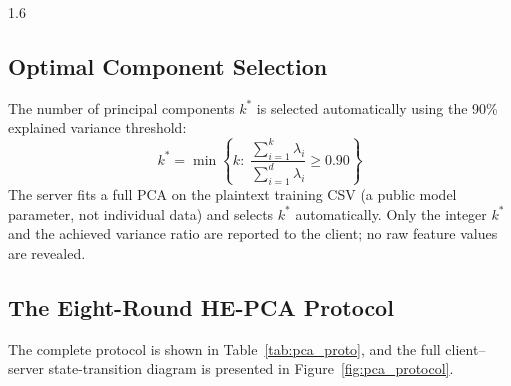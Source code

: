 \begin{spacing}{1.6}

\subsection{Optimal Component Selection}

The number of principal components $k^*$ is selected automatically using
the 90\% explained variance threshold:
\begin{equation}
  k^* = \min\!\left\{k :\;
    \frac{\sum_{i=1}^{k}\lambda_i}{\sum_{i=1}^{d}\lambda_i}
    \geq 0.90\right\}
\end{equation}
The server fits a full PCA on the plaintext training CSV (a public model
parameter, not individual data) and selects $k^*$ automatically.
Only the integer $k^*$ and the achieved variance ratio are reported to the
client; no raw feature values are revealed.

\subsection{The Eight-Round HE-PCA Protocol}

The complete protocol is shown in Table~\ref{tab:pca_proto}, and the full
client--server state-transition diagram is presented in
Figure~\ref{fig:pca_protocol}.

\end{spacing}

